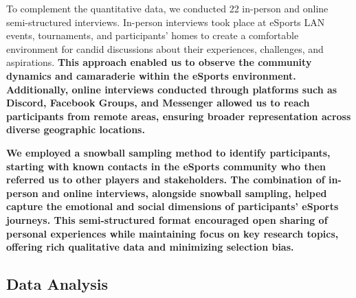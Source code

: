 \documentclass[manuscript,screen,review,anonymous]{acmart}
\begin{document}
To complement the quantitative data, we conducted 22 in-person and online semi-structured interviews. In-person interviews took place at eSports LAN events, tournaments, and participants' homes to create a comfortable environment for candid discussions about their experiences, challenges, and aspirations. \textbf{This approach enabled us to observe the community dynamics and camaraderie within the eSports environment. Additionally, online interviews conducted through platforms such as Discord, Facebook Groups, and Messenger allowed us to reach participants from remote areas, ensuring broader representation across diverse geographic locations.}

\textbf{We employed a snowball sampling method to identify participants, starting with known contacts in the eSports community who then referred us to other players and stakeholders. The combination of in-person and online interviews, alongside snowball sampling, helped capture the emotional and social dimensions of participants' eSports journeys. This semi-structured format encouraged open sharing of personal experiences while maintaining focus on key research topics, offering rich qualitative data and minimizing selection bias.}

\subsection{Data Analysis}


\end{document}
